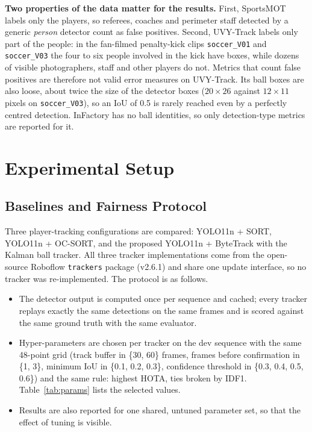 \documentclass[conference]{IEEEtran}
\begin{document}
\textbf{Two properties of the data matter for the results.} First, SportsMOT
labels only the players, so referees, coaches and perimeter staff detected by a
generic \emph{person} detector count as false positives. Second, UVY-Track labels
only part of the people: in the fan-filmed penalty-kick clips \texttt{soccer\_V01}
and \texttt{soccer\_V03} the four to six people involved in the kick have boxes,
while dozens of visible photographers, staff and other players do not. Metrics
that count false positives are therefore not valid error measures on UVY-Track.
Its ball boxes are also loose, about twice the size of the detector boxes
($20\times26$ against $12\times11$ pixels on \texttt{soccer\_V03}), so an IoU of
0.5 is rarely reached even by a perfectly centred detection. InFactory has no ball
identities, so only detection-type metrics are reported for it.

\section{Experimental Setup}
\subsection{Baselines and Fairness Protocol}
Three player-tracking configurations are compared: YOLO11n + SORT, YOLO11n +
OC-SORT, and the proposed YOLO11n + ByteTrack with the Kalman ball tracker. All
three tracker implementations come from the open-source Roboflow
\texttt{trackers} package (v2.6.1) and share one update interface, so no tracker was
re-implemented. The protocol is as follows.
\begin{itemize}
\item The detector output is computed once per sequence and cached; every
tracker replays exactly the same detections on the same frames and is scored
against the same ground truth with the same evaluator.
\item Hyper-parameters are chosen per tracker on the dev sequence with the same
48-point grid (track buffer in \{30, 60\} frames, frames before confirmation in
\{1, 3\}, minimum IoU in \{0.1, 0.2, 0.3\}, confidence threshold in
\{0.3, 0.4, 0.5, 0.6\}) and the same rule: highest HOTA, ties broken by IDF1.
Table~\ref{tab:params} lists the selected values.
\item Results are also reported for one shared, untuned parameter set, so that
the effect of tuning is visible.
\end{itemize}
\end{document}
